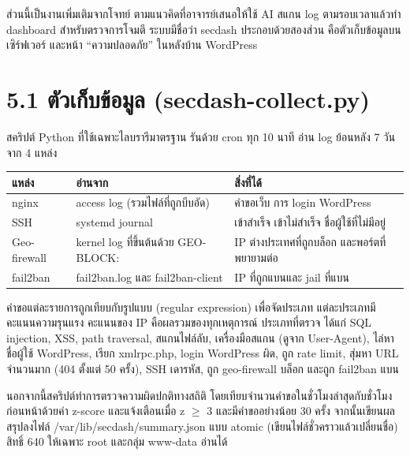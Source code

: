 
ส่วนนี้เป็นงานเพิ่มเติมจากโจทย์ ตามแนวคิดที่อาจารย์เสนอให้ใช้ AI สแกน log ตามรอบเวลาแล้วทำ dashboard สำหรับตรวจการโจมตี ระบบมีชื่อว่า secdash ประกอบด้วยสองส่วน คือตัวเก็บข้อมูลบนเซิร์ฟเวอร์ และหน้า ``ความปลอดภัย'' ในหลังบ้าน WordPress

\section*{5.1 ตัวเก็บข้อมูล (secdash-collect.py)}

สคริปต์ Python ที่ใช้เฉพาะไลบรารีมาตรฐาน รันด้วย cron ทุก 10 นาที อ่าน log ย้อนหลัง 7 วันจาก 4 แหล่ง

\begingroup\small\begin{longtable}[]{@{}>{\raggedright\arraybackslash}p{}>{\raggedright\arraybackslash}p{}>{\raggedright\arraybackslash}p{}@{}}
\toprule\noalign{}
แหล่ง & อ่านจาก & สิ่งที่ได้ \\
\midrule\noalign{}
\endhead
\bottomrule\noalign{}
\endlastfoot
nginx & access log (รวมไฟล์ที่ถูกบีบอัด) & คำขอเว็บ การ login WordPress \\
SSH & systemd journal & เข้าสำเร็จ เข้าไม่สำเร็จ ชื่อผู้ใช้ที่ไม่มีอยู่ \\
Geo-firewall & kernel log ที่ขึ้นต้นด้วย GEO-BLOCK: & IP ต่างประเทศที่ถูกบล็อก และพอร์ตที่พยายามต่อ \\
fail2ban & fail2ban.log และ fail2ban-client & IP ที่ถูกแบนและ jail ที่แบน \\
\end{longtable}\endgroup

คำขอแต่ละรายการถูกเทียบกับรูปแบบ (regular expression) เพื่อจัดประเภท แต่ละประเภทมีคะแนนความรุนแรง คะแนนของ IP คือผลรวมของทุกเหตุการณ์ ประเภทที่ตรวจ ได้แก่ SQL injection, XSS, path traversal, สแกนไฟล์ลับ, เครื่องมือสแกน (ดูจาก User-Agent), ไล่หาชื่อผู้ใช้ WordPress, เรียก xmlrpc.php, login WordPress ผิด, ถูก rate limit, สุ่มหา URL จำนวนมาก (404 ตั้งแต่ 50 ครั้ง), SSH เดารหัส, ถูก geo-firewall บล็อก และถูก fail2ban แบน

นอกจากนี้สคริปต์ทำการตรวจความผิดปกติทางสถิติ โดยเทียบจำนวนคำขอในชั่วโมงล่าสุดกับชั่วโมงก่อนหน้าด้วยค่า z-score และแจ้งเตือนเมื่อ z $\geq$ 3 และมีคำขออย่างน้อย 30 ครั้ง จากนั้นเขียนผลสรุปลงไฟล์ /var/lib/secdash/summary.json แบบ atomic (เขียนไฟล์ชั่วคราวแล้วเปลี่ยนชื่อ) สิทธิ์ 640 ให้เฉพาะ root และกลุ่ม www-data อ่านได้

